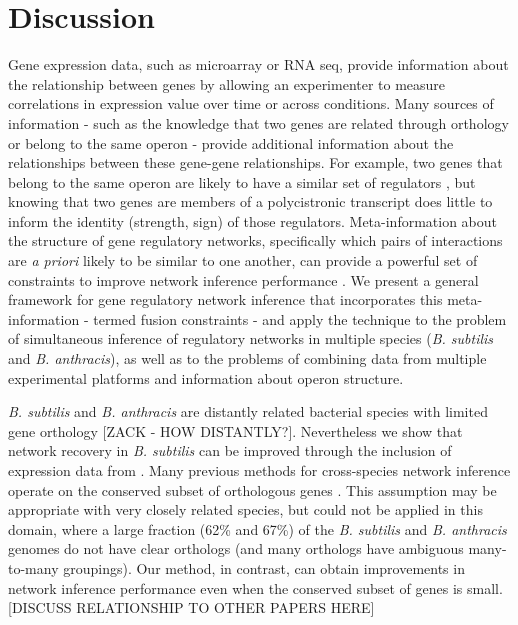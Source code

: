 \documentclass[11pt]{article}
\begin{document}
\section{Discussion}
Gene expression data, such as microarray or RNA seq, provide information about the relationship between genes by allowing an experimenter to measure correlations in expression value over time or across conditions. Many sources of information - such as the knowledge that two genes are related through orthology or belong to the same operon - provide additional information about the relationships between these gene-gene relationships. 
For example,  two genes that belong to the same operon are likely to have a similar set of regulators \cite{lawrence_shared_2002}, but knowing that two genes are members of a polycistronic transcript does little to inform the identity (strength, sign) of those regulators. 
Meta-information about the structure of gene regulatory networks, specifically which pairs of interactions are \textit{a priori} likely to be similar to one another, can provide a powerful set of constraints to improve network inference performance \cite{roy_arboretum:_2013, pierson_sharing_2015}. 
We present a general framework for gene regulatory network inference that incorporates this meta-information - termed fusion constraints - and apply the technique to the problem of simultaneous inference of regulatory networks in multiple species (\textit{B. subtilis} and \textit{B. anthracis}), as well as to the problems of combining data from multiple experimental platforms and information about operon structure.

\textit{B. subtilis} and \textit{B. anthracis} are distantly related bacterial species with limited gene orthology [ZACK - HOW DISTANTLY?]. Nevertheless we show that network recovery in \textit{B. subtilis} can be improved through the inclusion of expression data from . 
Many previous methods for cross-species network inference operate on the conserved subset of orthologous genes \cite{dillman_comparative_2015}. 
This assumption may be appropriate with very closely related species, but could not be applied in this domain, where a large fraction (62\% and 67\%) of the \textit{B. subtilis} and \textit{B. anthracis} genomes do not have clear orthologs (and many orthologs have ambiguous many-to-many groupings). 
Our method, in contrast, can obtain improvements in network inference performance even when the conserved subset of genes is small. [DISCUSS RELATIONSHIP TO OTHER PAPERS HERE]
\end{document}
